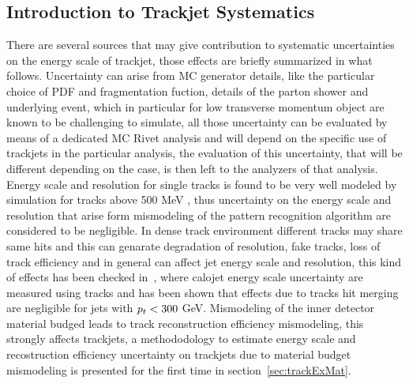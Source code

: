 \subsection{Introduction to Trackjet Systematics}
There are several sources that may give contribution to systematic uncertainties on the energy scale of trackjet, those
effects  are briefly summarized in what follows. Uncertainty can arise from MC generator details, like the particular 
choice of PDF and fragmentation fuction, details of the parton shower and underlying event, which in particular for low
transverse momentum object are known to be challenging to simulate, all those uncertainty can be evaluated by means of
a dedicated MC Rivet \cite{RIVET} analysis and will depend on the specific use of trackjets in the particular analysis,
the evaluation of this uncertainty, that will be different depending on the case, is then left to the analyzers of 
that analysis. Energy scale and resolution for single tracks is found to be very well modeled by simulation for tracks above
500 MeV \cite{IDperformance}, thus uncertainty on the energy scale and resolution that arise form mismodeling of
the pattern recognition algorithm are considered to be negligible. In dense track environment  different tracks may share 
same hits and this can genarate degradation of resolution, fake tracks, loss of track efficiency and in general can affect 
jet energy scale and resolution, this kind of effects has been checked in~\cite{JEStrack}, where calojet energy scale 
uncertainty are measured using tracks and has been shown that effects due to tracks hit merging are negligible 
for jets with $p_{t} < 300 $ GeV. Mismodeling of the inner detector material budged leads
to track reconstruction efficiency mismodeling, this strongly affects trackjets,
a methododology to estimate energy scale and recostruction efficiency uncertainty on trackjets due to material
budget mismodeling is presented for the first time in section~\ref{sec:trackExMat}.



